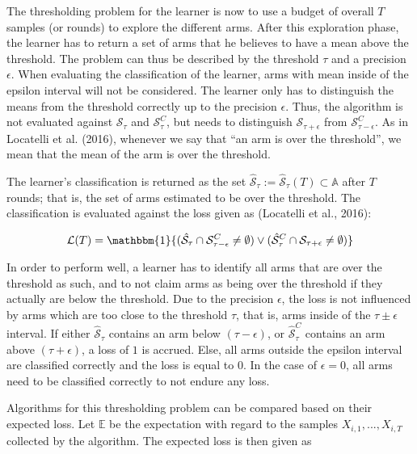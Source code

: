 \documentclass[12pt,]{article}
\begin{document}
The thresholding problem for the learner is now to use a budget of
overall \(T\) samples (or rounds) to explore the different arms. After
this exploration phase, the learner has to return a set of arms that he
believes to have a mean above the threshold. The problem can thus be
described by the threshold \(\tau\) and a precision \(\epsilon\). When
evaluating the classification of the learner, arms with mean inside of
the epsilon interval will not be considered. The learner only has to
distinguish the means from the threshold correctly up to the precision
\(\epsilon\). Thus, the algorithm is not evaluated against
\(\mathcal{S}_{\tau}\) and \(\mathcal{S}^C_{\tau}\), but needs to
distinguish \(\mathcal{S}_{\tau+\epsilon}\) from
\(\mathcal{S}^C_{\tau-\epsilon}\). As in Locatelli et al. (2016),
whenever we say that ``an arm is over the threshold'', we mean that the
mean of the arm is over the threshold.

The learner's classification is returned as the set
\(\hat{\mathcal{S}}_{\tau} := \hat{\mathcal{S}}_{\tau}(T) \subset \mathbb{A}\)
after \(T\) rounds; that is, the set of arms estimated to be over the
threshold. The classification is evaluated against the loss given as
(Locatelli et al., 2016):

\[
\mathcal{L}(T) = \mathbbm{1}{(\hat{\mathcal{S}}_{\tau} \cap \mathcal{S}_{\tau-\epsilon}^C \neq \emptyset) \lor (\hat{\mathcal{S}}_{\tau}^C \cap \mathcal{S}_{\tau+\epsilon} \neq \emptyset)}
\]

In order to perform well, a learner has to identify all arms that are
over the threshold as such, and to not claim arms as being over the
threshold if they actually are below the threshold. Due to the precision
\(\epsilon\), the loss is not influenced by arms which are too close to
the threshold \(\tau\), that is, arms inside of the
\(\tau \pm \epsilon\) interval. If either \(\hat{\mathcal{S}}_{\tau}\)
contains an arm below \((\tau - \epsilon)\), or
\(\hat{\mathcal{S}}^C_{\tau}\) contains an arm above
\((\tau + \epsilon)\), a loss of \(1\) is accrued. Else, all arms
outside the epsilon interval are classified correctly and the loss is
equal to \(0\). In the case of \(\epsilon = 0\), all arms need to be
classified correctly to not endure any loss.

Algorithms for this thresholding problem can be compared based on their
expected loss. Let \(\mathbb{E}\) be the expectation with regard to the
samples \(X_{i,1}, ..., X_{i,T}\) collected by the algorithm. The
expected loss is then given as
\end{document}
